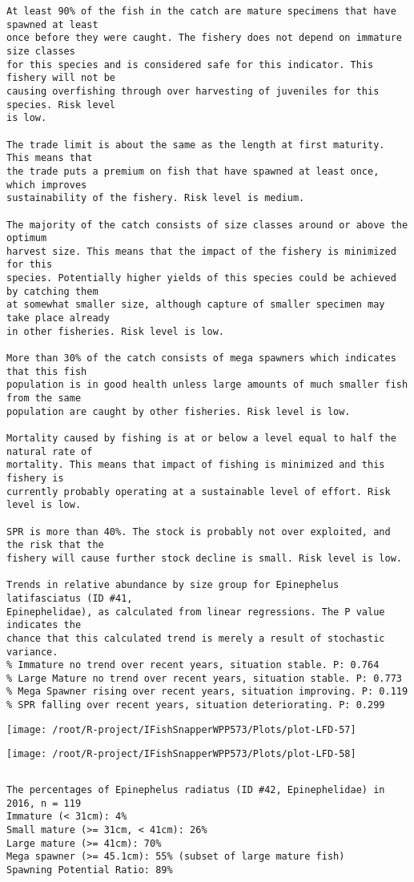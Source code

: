 \documentclass{report}\usepackage[]{graphicx}\usepackage[]{color}
\makeatletter
\def\maxwidth{ %
  \ifdim\Gin@nat@width>\linewidth
    \linewidth
  \else
    \Gin@nat@width
  \fi
}
\newenvironment{kframe}{%
 \def\at@end@of@kframe{}%
 \ifinner\ifhmode%
  \def\at@end@of@kframe{\end{minipage}}%
  \begin{minipage}{\columnwidth}%
 \fi\fi%
 \def\FrameCommand##1{\hskip\@totalleftmargin \hskip-\fboxsep
 \colorbox{shadecolor}{##1}\hskip-\fboxsep
     \hskip-\linewidth \hskip-\@totalleftmargin \hskip\columnwidth}%
 \MakeFramed {\advance\hsize-\width
   \@totalleftmargin\z@ \linewidth\hsize
   \@setminipage}}%
 {\par\unskip\endMakeFramed%
 \at@end@of@kframe}
\newenvironment{knitrout}{}{} %
\makeatother
\begin{document}
\begin{knitrout}
\begin{kframe}
\begin{verbatim}
At least 90% of the fish in the catch are mature specimens that have spawned at least
once before they were caught. The fishery does not depend on immature size classes
for this species and is considered safe for this indicator. This fishery will not be
causing overfishing through over harvesting of juveniles for this species. Risk level
is low.

The trade limit is about the same as the length at first maturity.  This means that
the trade puts a premium on fish that have spawned at least once, which improves
sustainability of the fishery. Risk level is medium.

The majority of the catch consists of size classes around or above the optimum
harvest size. This means that the impact of the fishery is minimized for this
species. Potentially higher yields of this species could be achieved by catching them
at somewhat smaller size, although capture of smaller specimen may take place already
in other fisheries. Risk level is low.

More than 30% of the catch consists of mega spawners which indicates that this fish
population is in good health unless large amounts of much smaller fish from the same
population are caught by other fisheries. Risk level is low.
 
Mortality caused by fishing is at or below a level equal to half the natural rate of
mortality. This means that impact of fishing is minimized and this fishery is
currently probably operating at a sustainable level of effort. Risk level is low.
 
SPR is more than 40%. The stock is probably not over exploited, and the risk that the
fishery will cause further stock decline is small. Risk level is low.
 
Trends in relative abundance by size group for Epinephelus latifasciatus (ID #41,
Epinephelidae), as calculated from linear regressions. The P value indicates the
chance that this calculated trend is merely a result of stochastic variance.
% Immature no trend over recent years, situation stable. P: 0.764
% Large Mature no trend over recent years, situation stable. P: 0.773
% Mega Spawner rising over recent years, situation improving. P: 0.119
% SPR falling over recent years, situation deteriorating. P: 0.299
\end{verbatim}
\end{kframe}
\texttt{[image: /root/R-project/IFishSnapperWPP573/Plots/plot-LFD-57]} 

\texttt{[image: /root/R-project/IFishSnapperWPP573/Plots/plot-LFD-58]} 
\begin{kframe}\begin{verbatim}
\end{verbatim}
\end{kframe}
\clearpage
\newpage
\begin{kframe}\begin{verbatim}The percentages of Epinephelus radiatus (ID #42, Epinephelidae) in 2016, n = 119
Immature (< 31cm): 4%
Small mature (>= 31cm, < 41cm): 26%
Large mature (>= 41cm): 70%
Mega spawner (>= 45.1cm): 55% (subset of large mature fish)
Spawning Potential Ratio: 89%
 

\end{verbatim}
\end{kframe}
\end{knitrout}
\end{document}
